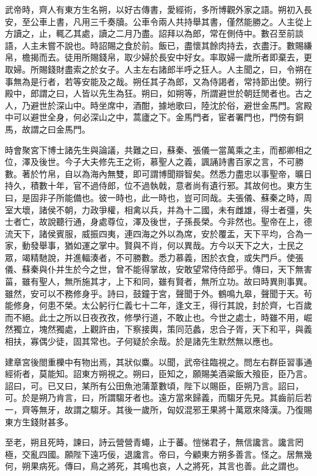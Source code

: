 武帝時，齊人有東方生名朔，以好古傳書，愛經術，多所博觀外家之語。朔初入長安，至公車上書，凡用三千奏牘。公車令兩人共持舉其書，僅然能勝之。人主從上方讀之，止，輒乙其處，讀之二月乃盡。詔拜以為郎，常在側侍中。數召至前談語，人主未嘗不說也。時詔賜之食於前。飯已，盡懷其餘肉持去，衣盡汙。數賜縑帛，檐揭而去。徒用所賜錢帛，取少婦於長安中好女。率取婦一歲所者即棄去，更取婦。所賜錢財盡索之於女子。人主左右諸郎半呼之狂人。人主聞之，曰，令朔在事無為是行者，若等安能及之哉。朔任其子為郎，又為侍謁者，常持節出使。朔行殿中，郎謂之曰，人皆以先生為狂。朔曰，如朔等，所謂避世於朝廷閒者也。古之人，乃避世於深山中。時坐席中，酒酣，據地歌曰，陸沈於俗，避世金馬門。宮殿中可以避世全身，何必深山之中，蒿廬之下。金馬門者，宦者署門也，門傍有銅馬，故謂之曰金馬門。

時會聚宮下博士諸先生與論議，共難之曰，蘇秦、張儀一當萬乘之主，而都卿相之位，澤及後世。今子大夫修先王之術，慕聖人之義，諷誦詩書百家之言，不可勝數。著於竹帛，自以為海內無雙，即可謂博聞辯智矣。然悉力盡忠以事聖帝，曠日持久，積數十年，官不過侍郎，位不過執戟，意者尚有遺行邪。其故何也。東方生曰，是固非子所能備也。彼一時也，此一時也，豈可同哉。夫張儀、蘇秦之時，周室大壞，諸侯不朝，力政爭權，相禽以兵，并為十二國，未有雌雄，得士者彊，失士者亡，故說聽行通，身處尊位，澤及後世，子孫長榮。今非然也。聖帝在上，德流天下，諸侯賓服，威振四夷，連四海之外以為席，安於覆盂，天下平均，合為一家，動發舉事，猶如運之掌中。賢與不肖，何以異哉。方今以天下之大，士民之眾，竭精馳說，并進輻湊者，不可勝數。悉力慕義，困於衣食，或失門戶。使張儀、蘇秦與仆并生於今之世，曾不能得掌故，安敢望常侍侍郎乎。傳曰，天下無害菑，雖有聖人，無所施其才，上下和同，雖有賢者，無所立功。故曰時異則事異。雖然，安可以不務修身乎。詩曰，鼓鐘于宮，聲聞于外。鶴鳴九皋，聲聞于天。茍能修身，何患不榮。太公躬行仁義七十二年，逢文王，得行其說，封於齊，七百歲而不絕。此士之所以日夜孜孜，修學行道，不敢止也。今世之處士，時雖不用，崛然獨立，塊然獨處，上觀許由，下察接輿，策同范蠡，忠合子胥，天下和平，與義相扶，寡偶少徒，固其常也。子何疑於余哉。於是諸先生默然無以應也。

建章宮後閤重櫟中有物出焉，其狀似麋。以聞，武帝往臨視之。問左右群臣習事通經術者，莫能知。詔東方朔視之。朔曰，臣知之，願賜美酒粱飯大飱臣，臣乃言。詔曰，可。已又曰，某所有公田魚池蒲葦數頃，陛下以賜臣，臣朔乃言。詔曰，可。於是朔乃肯言，曰，所謂騶牙者也。遠方當來歸義，而騶牙先見。其齒前后若一，齊等無牙，故謂之騶牙。其後一歲所，匈奴混邪王果將十萬眾來降漢。乃復賜東方生錢財甚多。

至老，朔且死時，諫曰，詩云營營青蠅，止于蕃。愷悌君子，無信讒言。讒言罔極，交亂四國。願陛下遠巧佞，退讒言。帝曰，今顧東方朔多善言。怪之。居無幾何，朔果病死。傳曰，鳥之將死，其鳴也哀，人之將死，其言也善。此之謂也。

